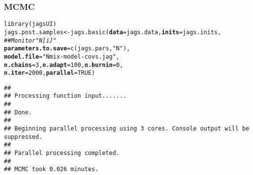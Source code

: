 \documentclass[color=usenames,dvipsnames]{beamer}\usepackage[]{graphicx}\usepackage[]{color}
\makeatletter
\newcommand{\hlnum}[1]{\textcolor[rgb]{0.69,0.494,0}{#1}}%
\newcommand{\hlstr}[1]{\textcolor[rgb]{0.749,0.012,0.012}{#1}}%
\newcommand{\hlcom}[1]{\textcolor[rgb]{0.514,0.506,0.514}{\textit{#1}}}%
\newcommand{\hlstd}[1]{\textcolor[rgb]{0,0,0}{#1}}%
\newcommand{\hlkwb}[1]{\textcolor[rgb]{0,0.341,0.682}{#1}}%
\newcommand{\hlkwc}[1]{\textcolor[rgb]{0,0,0}{\textbf{#1}}}%
\newcommand{\hlkwd}[1]{\textcolor[rgb]{0.004,0.004,0.506}{#1}}%
\newenvironment{kframe}{%
 \def\at@end@of@kframe{}%
 \ifinner\ifhmode%
  \def\at@end@of@kframe{\end{minipage}}%
  \begin{minipage}{\columnwidth}%
 \fi\fi%
 \def\FrameCommand##1{\hskip\@totalleftmargin \hskip-\fboxsep
 \colorbox{shadecolor}{##1}\hskip-\fboxsep
     \hskip-\linewidth \hskip-\@totalleftmargin \hskip\columnwidth}%
 \MakeFramed {\advance\hsize-\width
   \@totalleftmargin\z@ \linewidth\hsize
   \@setminipage}}%
 {\par\unskip\endMakeFramed%
 \at@end@of@kframe}
\newenvironment{knitrout}{}{} %
\makeatother
\begin{document}
\begin{frame}[fragile]
  \frametitle{MCMC}
  \small
\begin{knitrout}\scriptsize
{}\color{fgcolor}\begin{kframe}
\begin{alltt}
\hlkwd{library}\hlstd{(jagsUI)}
\hlstd{jags.post.samples} \hlkwb{<-} \hlkwd{jags.basic}\hlstd{(}\hlkwc{data}\hlstd{=jags.data,} \hlkwc{inits}\hlstd{=jags.inits,}
                                \hlcom{## Monitor "N[i]" }
                                \hlkwc{parameters.to.save}\hlstd{=}\hlkwd{c}\hlstd{(jags.pars,} \hlstr{"N"}\hlstd{),}
                                \hlkwc{model.file}\hlstd{=}\hlstr{"Nmix-model-covs.jag"}\hlstd{,}
                                \hlkwc{n.chains}\hlstd{=}\hlnum{3}\hlstd{,} \hlkwc{n.adapt}\hlstd{=}\hlnum{100}\hlstd{,} \hlkwc{n.burnin}\hlstd{=}\hlnum{0}\hlstd{,}
                                \hlkwc{n.iter}\hlstd{=}\hlnum{2000}\hlstd{,} \hlkwc{parallel}\hlstd{=}\hlnum{TRUE}\hlstd{)}
\end{alltt}
\begin{verbatim}
## 
## Processing function input....... 
## 
## Done. 
##  
## Beginning parallel processing using 3 cores. Console output will be suppressed.
## 
## Parallel processing completed.
## 
## MCMC took 0.026 minutes.
\end{verbatim}
\end{kframe}
\end{knitrout}
\end{frame}
\end{document}
